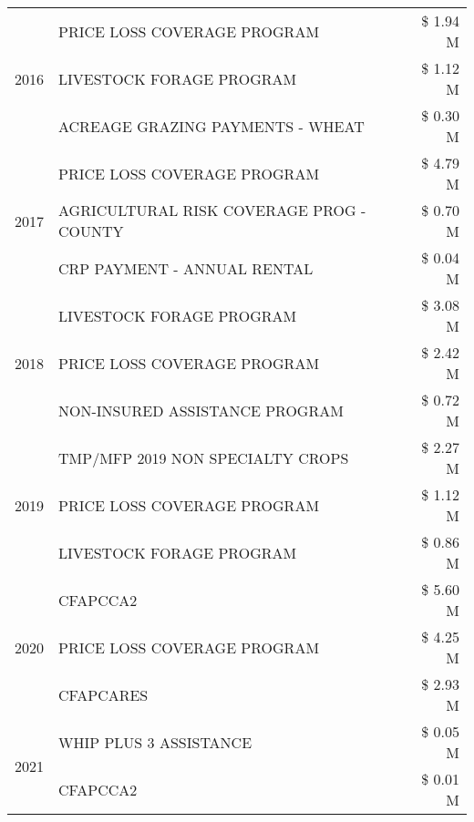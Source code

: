 \begin{tabular}{llr}
\cline{1-3}
\multirow[t]{3}{*}{2016} & PRICE LOSS COVERAGE PROGRAM & \$ 1.94 M \\
 & LIVESTOCK FORAGE PROGRAM & \$ 1.12 M \\
 & ACREAGE GRAZING PAYMENTS - WHEAT & \$ 0.30 M \\
\cline{1-3}
\multirow[t]{3}{*}{2017} & PRICE LOSS COVERAGE PROGRAM & \$ 4.79 M \\
 & AGRICULTURAL RISK COVERAGE PROG - COUNTY & \$ 0.70 M \\
 & CRP PAYMENT - ANNUAL RENTAL & \$ 0.04 M \\
\cline{1-3}
\multirow[t]{3}{*}{2018} & LIVESTOCK FORAGE PROGRAM & \$ 3.08 M \\
 & PRICE LOSS COVERAGE PROGRAM & \$ 2.42 M \\
 & NON-INSURED ASSISTANCE PROGRAM & \$ 0.72 M \\
\cline{1-3}
\multirow[t]{3}{*}{2019} & TMP/MFP 2019 NON SPECIALTY CROPS & \$ 2.27 M \\
 & PRICE LOSS COVERAGE PROGRAM & \$ 1.12 M \\
 & LIVESTOCK FORAGE PROGRAM & \$ 0.86 M \\
\cline{1-3}
\multirow[t]{3}{*}{2020} & CFAPCCA2 & \$ 5.60 M \\
 & PRICE LOSS COVERAGE PROGRAM & \$ 4.25 M \\
 & CFAPCARES & \$ 2.93 M \\
\cline{1-3}
\multirow[t]{2}{*}{2021} & WHIP PLUS 3 ASSISTANCE & \$ 0.05 M \\
 & CFAPCCA2 & \$ 0.01 M \\
\cline{1-3}
\bottomrule
\end{tabular}
